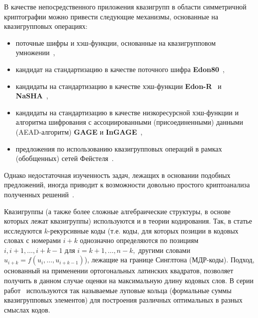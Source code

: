    В качестве непосредственного приложения квазигрупп в области симметричной криптографии можно привести следующие механизмы, основанные на квазигрупповых операциях:
    \begin{itemize}
        \item поточные шифры и хэш-функции, основанные на квазигрупповом умножении~\autocite{markovski1999quasigroup, markovski2003quasigroup, markovski2017quasigroup, snavsel2009hash},
        \item кандидат на стандартизацию в качестве поточного шифра \textbf{Edon80}~\autocite{edon80},
        \item кандидаты на стандартизацию в качестве хэш-функции \textbf{Edon-R}~\autocite{EdonR, EdonRprime} и \textbf{NaSHA}~\autocite{nasha, mileva2009quasigroup},
        \item кандидаты на стандартизацию в качестве низкоресурсной хэш-функции и алгоритма шифрования с ассоциированными (присоединенными) данными (AEAD-алгоритм) \textbf{GAGE} и \textbf{InGAGE}~\autocite{otte2019gage, gligoroski2019s},
        \item предложения по использованию квазигрупповых операций в рамках (обобщенных) сетей Фейстеля~\autocite{tecseleanu2021quasigroups, tecseleanu2022security, tecseleanu2023cryptographic, cherednik17, cherednik19, cherednik20}.
    \end{itemize}
    Однако недостаточная изученность задач, лежащих в основании подобных предложений, иногда приводит к возможности довольно простого криптоанализа полученных решений~\autocite{vojvoda2004cryptanalysis, slaminkova2010cryptanalysis, hell2007key, vojvoda2007note, nikolicfree, li2010collision}.

    Квазигруппы (а также более сложные алгебраические структуры, в основе которых лежат квазигруппы) используются и в теории кодирования.
    Так, в статье \autocite{nechaev98} исследуются $k$-рекурсивные коды (т.е. коды, для которых позиции в кодовых словах с номерами $i+k$ однозначно определяются по позициям $i, i+1, \ldots, i+k-1$ для $i = k+1, \ldots, n-k,$ другими словами $u_{i+k} = f(u_i, \ldots, u_{i+k-1})$), лежащие на границе Синглтона (МДР-коды).
    Подход, основанный на применении ортогональных латинских квадратов, позволяет получить в данном случае оценки на максимальную длину кодовых слов.
    В серии работ~\autocite{nechaev04, couselo2004loop, markov12, markov2020nonassociative} используются так называемые луповые кольца (формальные суммы квазигрупповых элементов) для построения различных оптимальных в разных смыслах кодов.

